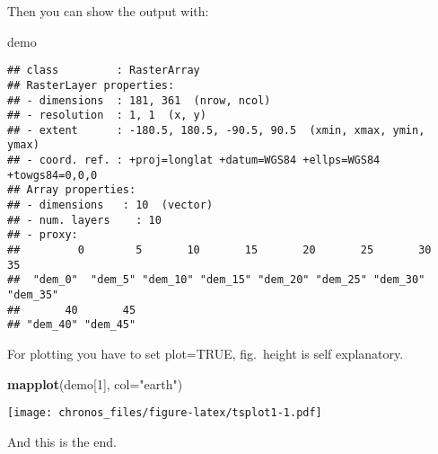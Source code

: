 \documentclass[]{article}
\newenvironment{Shaded}{\begin{snugshade}}{\end{snugshade}}
\newcommand{\DataTypeTok}[1]{\textcolor[rgb]{0.13,0.29,0.53}{#1}}
\newcommand{\DecValTok}[1]{\textcolor[rgb]{0.00,0.00,0.81}{#1}}
\newcommand{\KeywordTok}[1]{\textcolor[rgb]{0.13,0.29,0.53}{\textbf{#1}}}
\newcommand{\NormalTok}[1]{#1}
\newcommand{\StringTok}[1]{\textcolor[rgb]{0.31,0.60,0.02}{#1}}
\begin{document}
Then you can show the output with:

\begin{Shaded}
\begin{Highlighting}[]
\NormalTok{demo}
\end{Highlighting}
\end{Shaded}

\begin{verbatim}
## class         : RasterArray 
## RasterLayer properties: 
## - dimensions  : 181, 361  (nrow, ncol)
## - resolution  : 1, 1  (x, y)
## - extent      : -180.5, 180.5, -90.5, 90.5  (xmin, xmax, ymin, ymax)
## - coord. ref. : +proj=longlat +datum=WGS84 +ellps=WGS84 +towgs84=0,0,0 
## Array properties: 
## - dimensions   : 10  (vector)
## - num. layers    : 10
## - proxy:
##         0        5       10       15       20       25       30       35 
##  "dem_0"  "dem_5" "dem_10" "dem_15" "dem_20" "dem_25" "dem_30" "dem_35" 
##       40       45 
## "dem_40" "dem_45"
\end{verbatim}

For plotting you have to set plot=TRUE, fig.~height is self explanatory.

\begin{Shaded}
\begin{Highlighting}[]
\KeywordTok{mapplot}\NormalTok{(demo[}\DecValTok{1}\NormalTok{], }\DataTypeTok{col=}\StringTok{"earth"}\NormalTok{)}
\end{Highlighting}
\end{Shaded}

\texttt{[image: chronos\_files/figure-latex/tsplot1-1.pdf]}

And this is the end.
\end{document}
